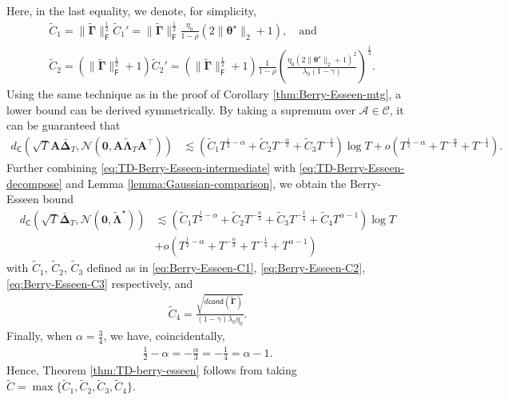 Here, in the last equality, we denote, for simplicity,
\begin{align}
&\widetilde{C}_1 = \|\tilde{\bm{\Gamma}}\|_{\mathsf{F}}^{\frac{1}{2}}\widetilde{C}_1' = \|\tilde{\bm{\Gamma}}\|_{\mathsf{F}}^{\frac{1}{2}}\frac{\eta_0}{1-\rho}(2\|\bm{\theta}^\star\|_2+1), \quad \text{and} \label{eq:Berry-Esseen-C1} \\ 
&\widetilde{C}_2 = (\|\tilde{\bm{\Gamma}}\|_{\mathsf{F}}^{\frac{1}{2}} + 1) \widetilde{C}_2' = (\|\tilde{\bm{\Gamma}}\|_{\mathsf{F}}^{\frac{1}{2}} + 1)\frac{1}{1-\rho} \left(\frac{\eta_0(2\|\bm{\theta}^\star\|_2+1)^2}{\lambda_0(1-\gamma)}\right)^{\frac{1}{3}} \label{eq:Berry-Esseen-C2}.
\end{align}
Using the same technique as in the proof of Corollary \ref{thm:Berry-Esseen-mtg}, a lower bound can be derived symmetrically. By taking a supremum over $\mathcal{A} \in \mathscr{C}$, it can be guaranteed that
\begin{align}\label{eq:TD-Berry-Esseen-intermediate}
d_\mathsf{C}(\sqrt{T}\bm{A}\bar{\bm{\Delta}}_T,\mathcal{N}(\bm{0},\bm{A}\tilde{\bm{\Lambda}}_T \bm{A}^\top)) &\lesssim (\widetilde{C}_1 T^{\frac{1}{2}-\alpha} + \widetilde{C}_2 T^{-\frac{\alpha}{3}}+ \widetilde{C}_3 T^{-\frac{1}{4}}){\log T} + o(T^{\frac{1}{2}-\alpha} + T^{-\frac{\alpha}{3}} + T^{-\frac{1}{4}}).
\end{align}
Further combining \eqref{eq:TD-Berry-Esseen-intermediate} with \eqref{eq:TD-Berry-Esseen-decompose} and Lemma \ref{lemma:Gaussian-comparison}, we obtain the Berry-Esseen bound
\begin{align*}
d_{\mathsf{C}}(\sqrt{T}\bar{\bm{\Delta}}_T,\mathcal{N}(\bm{0},\tilde{\bm{\Lambda}}^\star)) &\lesssim (\widetilde{C}_1 T^{\frac{1}{2}-\alpha} + \widetilde{C}_2 T^{-\frac{\alpha}{3}}+ \widetilde{C}_3 T^{-\frac{1}{4}} + \widetilde{C}_4 T^{\alpha-1}){\log T} \\ 
& + o(T^{\frac{1}{2}-\alpha} + T^{-\frac{\alpha}{3}} + T^{-\frac{1}{4}} + T^{\alpha-1})
\end{align*}
with $\widetilde{C}_1$, $\widetilde{C}_2$, $\widetilde{C}_3$ defined as in \eqref{eq:Berry-Esseen-C1}, \eqref{eq:Berry-Esseen-C2}, \eqref{eq:Berry-Esseen-C3} respectively, and
\begin{align*}
\widetilde{C}_4 = \frac{\sqrt{d\mathsf{cond}(\bm{\tilde{\Gamma}})}}{(1-\gamma)\lambda_0\eta_0}.
\end{align*}
Finally, when $\alpha = \frac{3}{4}$, we have, coincidentally,
\begin{align*}
\frac{1}{2}-\alpha = -\frac{\alpha}{3} = -\frac{1}{4} = \alpha-1.
\end{align*} 
Hence, Theorem \ref{thm:TD-berry-esseen} follows from taking $\tilde{C} = \max\{\tilde{C}_1,\tilde{C}_2,\tilde{C}_3,\tilde{C}_4\}$.

